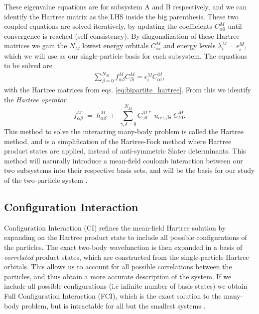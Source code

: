 \documentclass{subfiles}
\begin{document}
These eigenvalue equations are for subsystem A and B respectively, and we can identify the Hartree matrix as the LHS inside the big parenthesis. These two coupled equations are solved iteratively, by updating the coefficients $C_{\alpha 0}^M$ until convergence is reached (self-consistency). By diagonalization of these Hartree matrices we gain the $N_M$ lowest energy orbitals $C^M_{\alpha i}$ and energy levels $\lambda^M_i=\epsilon^M_i$\cite{leinonen2024coulomb}, which we will use as our single-particle basis for each subsystem. The equations to be solved are
\begin{align}
    \sum_{\beta=0}^{N_M} f_{\alpha\beta}^M C^M_{\beta i} = \epsilon_i^M C^M_{\alpha i}\label{eq:hartree_eigenvalue},
\end{align}
with the Hartree matrices from eqs. \eqref{eq:bipartite_hartree}. From this we identify the \emph{Hartree operator}
\begin{equation}
    f_{\alpha\beta}^M \;=\; h_{\alpha\beta}^M
    \;+\;\sum_{\gamma,\delta=0}^{N_{\bar M}}
      C_{\gamma0}^{\bar M\,*}\;u_{\alpha\gamma,\beta\delta}\;C_{\delta0}^{\bar M}.
\label{eq:hartree_operator}
\end{equation}
This method to solve the interacting many-body problem is called the Hartree method, and is a simplification of the Hartree-Fock method where Hartree product states are applied, instead of anti-symmetric Slater determinants. This method will naturally introduce a mean-field coulomb interaction between our two subsystems into their respective basis sets, and will be the basis for our study of the two-particle system \cite{leinonen2024coulomb}.
\subsection{Configuration Interaction}\label{sec:CI}
Configuration Interaction (CI) refines the mean-field Hartree solution by expanding on the Hartree product state to include all possible configurations of the particles. The exact two-body wavefunction is then expanded in a basis of \emph{correlated} product states, which are constructed from the single-particle Hartree orbitals. This allows us to account for all possible correlations between the particles, and thus obtain a more accurate description of the system. If we include all possible configurations (i.e infinite number of basis states) we obtain Full Configuration Interaction (FCI), which is the exact solution to the many-body problem, but is intractable for all but the smallest systems \cite{helgaker2013molecular, szabo1996modern}. \\
\end{document}
